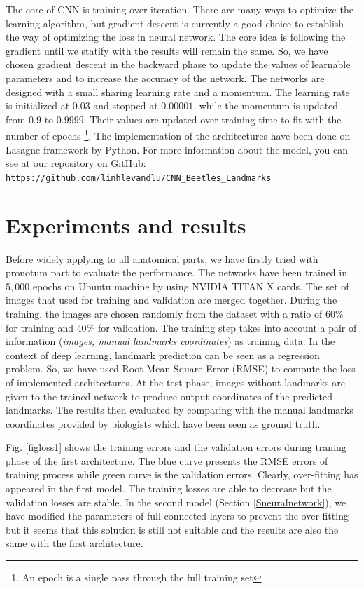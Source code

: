 \documentclass[review]{elsarticle}
\begin{document}
The core of CNN is training over iteration. There are many ways to optimize the learning algorithm, but gradient descent \cite{lecun2012efficient} is currently a good choice to establish the way of optimizing the loss in neural network. The core idea is following the gradient until we statify with the results will remain the same. So, we have chosen gradient descent in the backward phase to update the values of learnable parameters and to increase the accuracy of the network. The networks are designed with a small sharing learning rate and a momentum. The learning rate is initialized at $0.03$ and stopped at $0.00001$, while the momentum is updated from $0.9$ to $0.9999$. Their values are updated over training time to fit with the number of epochs \footnote{An epoch is a single pass through the full training set}. The implementation of the architectures have been done on Lasagne framework \cite{lasagne} by Python. For more information about the model, you can see at our repository on GitHub: \texttt{https://github.com/linhlevandlu/CNN\_Beetles\_Landmarks}

\section{Experiments and results}
\label{sexperiments}
Before widely applying to all anatomical parts, we have firstly tried with pronotum part to evaluate the performance. The networks have been trained in $5, 000$ epochs on Ubuntu machine by using NVIDIA TITAN X cards. The set of images that used for training and validation are merged together. During the training, the images are chosen randomly from the dataset with a ratio of $60\%$ for training and $40\%$ for validation. The training step takes into account a pair of information (\textit{images, manual landmarks coordinates})  as training data. In the context of deep learning, landmark prediction can be seen as a regression problem. So, we have used Root Mean Square Error (RMSE) to compute the loss of implemented architectures. At the test phase, images without landmarks are given to the trained network to produce output coordinates of the predicted landmarks. The results then evaluated by comparing with the manual landmarks coordinates provided by biologists which have been seen as ground truth. 

Fig. \ref{figloss1} shows the training errors and the validation errors during traning phase of the first architecture. The blue curve presents the RMSE errors of training process while green curve is the validation errors. Clearly, over-fitting has appeared in the first model. The training losses are able to decrease but the validation losses are stable. In the second model (Section \ref{Sneuralnetwork}), we have modified the parameters of full-connected layers to prevent the over-fitting but it seems that this solution is still not suitable and the results are also the same with the first architecture.
\end{document}
